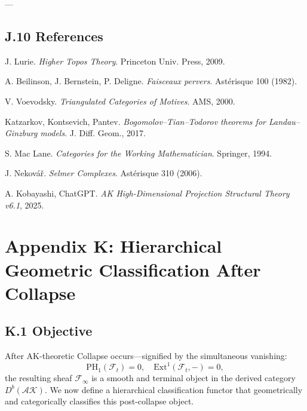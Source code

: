 \documentclass[11pt]{article}
\begin{document}
\begin{axiom}
\begin{axiom}
---

\subsection*{J.10 References}

\begin{thebibliography}{9}

J. Lurie.  
\textit{Higher Topos Theory}. Princeton Univ. Press, 2009.

A. Beilinson, J. Bernstein, P. Deligne.  
\textit{Faisceaux pervers}. Astérisque 100 (1982).

V. Voevodsky.  
\textit{Triangulated Categories of Motives}. AMS, 2000.

Katzarkov, Kontsevich, Pantev.  
\textit{Bogomolov–Tian–Todorov theorems for Landau–Ginzburg models}. J. Diff. Geom., 2017.

S. Mac Lane.  
\textit{Categories for the Working Mathematician}. Springer, 1994.

J. Nekovář.  
\textit{Selmer Complexes}. Astérisque 310 (2006).

A. Kobayashi, ChatGPT.  
\textit{AK High-Dimensional Projection Structural Theory v6.1}, 2025.

\end{thebibliography}




\section*{Appendix K: Hierarchical Geometric Classification After Collapse}

\subsection*{K.1 Objective}

After AK-theoretic Collapse occurs—signified by the simultaneous vanishing:
\[
\mathrm{PH}_1(\mathcal{F}_t) = 0, \quad \mathrm{Ext}^1(\mathcal{F}_t, -) = 0,
\]
the resulting sheaf \( \mathcal{F}_\infty \) is a smooth and terminal object in the derived category \( D^b(\mathcal{AK}) \).  
We now define a hierarchical classification functor that geometrically and categorically classifies this post-collapse object.


\end{axiom}
\end{axiom}
\end{document}
